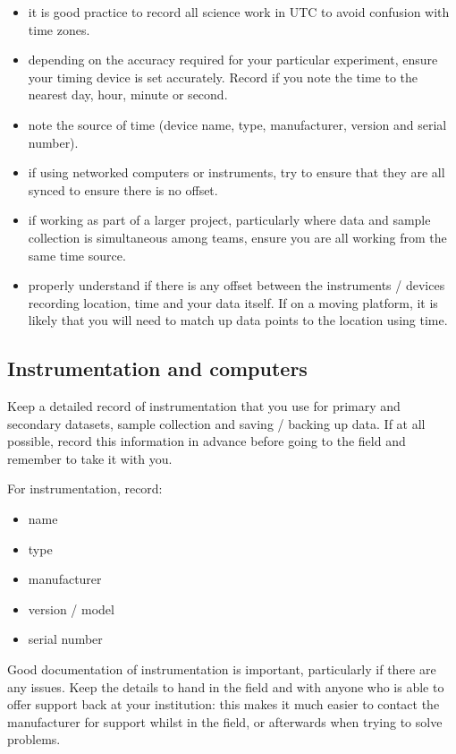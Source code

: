 \documentclass[12pt,a4paper,oneside]{report}
\providecommand{\tightlist}{%
  \setlength{\itemsep}{0pt}\setlength{\parskip}{0pt}}
\begin{document}
\begin{itemize}
\tightlist
\item
  it is good practice to record all science work in UTC to avoid
  confusion with time zones.
\item
  depending on the accuracy required for your particular experiment,
  ensure your timing device is set accurately. Record if you note the
  time to the nearest day, hour, minute or second.
\item
  note the source of time (device name, type, manufacturer, version and
  serial number).
\item
  if using networked computers or instruments, try to ensure that they
  are all synced to ensure there is no offset.
\item
  if working as part of a larger project, particularly where data and
  sample collection is simultaneous among teams, ensure you are all
  working from the same time source.
\item
  properly understand if there is any offset between the instruments /
  devices recording location, time and your data itself. If on a moving
  platform, it is likely that you will need to match up data points to
  the location using time.
\end{itemize}

\hypertarget{instrumentation-and-computers}{%
\subsection{Instrumentation and
computers}\label{instrumentation-and-computers}}

Keep a detailed record of instrumentation that you use for primary and
secondary datasets, sample collection and saving / backing up data. If
at all possible, record this information in advance before going to the
field and remember to take it with you.

For instrumentation, record:

\begin{itemize}
\tightlist
\item
  name
\item
  type
\item
  manufacturer
\item
  version / model
\item
  serial number
\end{itemize}

Good documentation of instrumentation is important, particularly if
there are any issues. Keep the details to hand in the field and with
anyone who is able to offer support back at your institution: this makes
it much easier to contact the manufacturer for support whilst in the
field, or afterwards when trying to solve problems.
\end{document}
